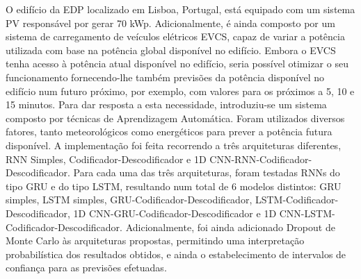 \noindent O edifício da \ac{EDP} localizado em Lisboa, Portugal, está equipado com um sistema \ac{PV} responsável por gerar 70 kWp. Adicionalmente, é ainda composto por um sistema de carregamento de veículos elétricos \ac{EVCS}, capaz de variar a potência utilizada com base na potência global disponível no edifício. Embora o \ac{EVCS} tenha acesso à potência atual disponível no edifício, seria possível otimizar o seu funcionamento fornecendo-lhe também previsões da potência disponível no edifício num futuro próximo, por exemplo, com valores para os próximos a 5, 10 e 15 minutos. Para dar resposta a esta necessidade, introduziu-se um sistema composto por técnicas de Aprendizagem Automática. Foram utilizados diversos fatores, tanto meteorológicos como energéticos para prever a potência futura disponível. A implementação foi feita recorrendo a três arquiteturas diferentes, \ac{RNN} Simples, Codificador-Descodificador e \ac{1D CNN}-\ac{RNN}-Codificador-Descodificador. Para cada uma das três arquiteturas, foram testadas \ac{RNN}s do tipo \ac{GRU} e do tipo \ac{LSTM}, resultando num total de 6 modelos distintos: \ac{GRU} simples, \ac{LSTM} simples, \ac{GRU}-Codificador-Descodificador, \ac{LSTM}-Codificador-Descodificador, \ac{1D CNN}-\ac{GRU}-Codificador-Descodificador e \ac{1D CNN}-\ac{LSTM}-Codificador-Descodificador. Adicionalmente, foi ainda adicionado Dropout de Monte Carlo às arquiteturas propostas, permitindo uma interpretação probabilística dos resultados obtidos, e ainda o estabelecimento de intervalos de confiança para as previsões efetuadas. 